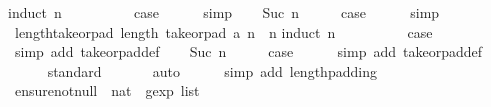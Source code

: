 \begin{isabellebody}
%
\endisadelimproof
%
\isatagproof
{}\isamarkupfalse%
{\isacharparenleft}induct\ n{\isacharparenright}\isanewline
\ \ \isamarkupfalse%
\ {}\isanewline
\ \ \isamarkupfalse%
\ \isamarkupfalse%
\ {\isacharquery}case\isanewline
\ \ \ \ \isamarkupfalse%
\ simp\isanewline
{}\isamarkupfalse%
\isanewline
\ \ \isamarkupfalse%
\ {\isacharparenleft}Suc\ n{\isacharparenright}\isanewline
\ \ \isamarkupfalse%
\ \isamarkupfalse%
\ {\isacharquery}case\isanewline
\ \ \ \ \isamarkupfalse%
\ simp\isanewline
{}\isamarkupfalse%
%
\endisatagproof
{\isafoldproof}%
%
\isadelimproof
\isanewline
%
\endisadelimproof
\isanewline
{}\isamarkupfalse%
\ length{\isacharunderscore}take{\isacharunderscore}or{\isacharunderscore}pad{\isacharcolon}\ {\isachardoublequoteopen}length\ {\isacharparenleft}take{\isacharunderscore}or{\isacharunderscore}pad\ a\ n{\isacharparenright}\ {\isacharequal}\ n{\isachardoublequoteclose}\isanewline
%
\isadelimproof
%
\endisadelimproof
%
\isatagproof
{}\isamarkupfalse%
{\isacharparenleft}induct\ n{\isacharparenright}\isanewline
\ \ \isamarkupfalse%
\ {}\isanewline
\ \ \isamarkupfalse%
\ \isamarkupfalse%
\ {\isacharquery}case\isanewline
\ \ \ \ \isamarkupfalse%
\ {\isacharparenleft}simp\ add{\isacharcolon}\ take{\isacharunderscore}or{\isacharunderscore}pad{\isacharunderscore}def{\isacharparenright}\isanewline
{}\isamarkupfalse%
\isanewline
\ \ \isamarkupfalse%
\ {\isacharparenleft}Suc\ n{\isacharparenright}\isanewline
\ \ \isamarkupfalse%
\ \isamarkupfalse%
\ {\isacharquery}case\isanewline
\ \ \ \ \isamarkupfalse%
\ {\isacharparenleft}simp\ add{\isacharcolon}\ take{\isacharunderscore}or{\isacharunderscore}pad{\isacharunderscore}def{\isacharparenright}\isanewline
\ \ \ \ \isamarkupfalse%
\ standard\isanewline
\ \ \ \ \ \isamarkupfalse%
\ auto{\isacharbrackleft}{}{\isacharbrackright}\isanewline
\ \ \ \ \isamarkupfalse%
\ {\isacharparenleft}simp\ add{\isacharcolon}\ length{\isacharunderscore}padding{\isacharparenright}\isanewline
{}\isamarkupfalse%
%
\endisatagproof
{\isafoldproof}%
%
\isadelimproof
\isanewline
%
\endisadelimproof
\isanewline
{}\isamarkupfalse%
\ ensure{\isacharunderscore}not{\isacharunderscore}null\ {\isacharcolon}{\isacharcolon}\ {\isachardoublequoteopen}nat\ {\isasymRightarrow}\ gexp\ list{\isachardoublequoteclose}\ \isanewline

\end{isabellebody}
